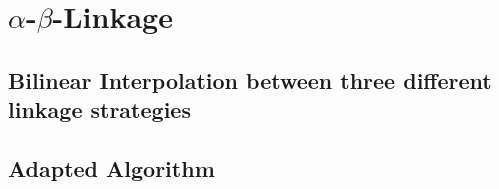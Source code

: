 \chapter{$\alpha$-$\beta$-Linkage}

\section{Bilinear Interpolation between three different linkage strategies}

\section{Adapted Algorithm}